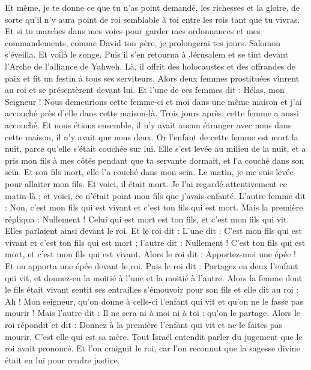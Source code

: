 \begin{multicols}{2}
Et même, je te donne ce que tu n'as point demandé, les richesses et la gloire, de sorte qu'il n'y aura point de roi semblable à toi entre les rois tant que tu vivras.
Et si tu marches dans mes voies pour garder mes ordonnances et mes commandements, comme David ton père, je prolongerai tes jours.
Salomon s'éveilla. Et voilà le songe. Puis il s'en retourna à Jérusalem et se tint devant l'Arche de l'alliance de Yahweh. Là, il offrit des holocaustes et des offrandes de paix et fit un festin à tous ses serviteurs.
Alors deux femmes prostituées vinrent au roi et se présentèrent devant lui.
Et l'une de ces femmes dit : Hélas, mon Seigneur ! Nous demeurions cette femme-ci et moi dans une même maison et j'ai accouché près d'elle dans cette maison-là.
Trois jours après, cette femme a aussi accouché. Et nous étions ensemble, il n'y avait aucun étranger avec nous dans cette maison, il n'y avait que nous deux.
Or l'enfant de cette femme est mort la nuit, parce qu'elle s'était couchée sur lui.
Elle s'est levée au milieu de la nuit, et a pris mon fils à mes côtés pendant que ta servante dormait, et l'a couché dans son sein. Et son fils mort, elle l'a couché dans mon sein.
Le matin, je me suis levée pour allaiter mon fils. Et voici, il était mort. Je l'ai regardé attentivement ce matin-là ; et voici, ce n'était point mon fils que j'avais enfanté.
L'autre femme dit : Non, c'est mon fils qui est vivant et c'est ton fils qui est mort. Mais la première répliqua : Nullement ! Celui qui est mort est ton fils, et c'est mon fils qui vit. Elles parlaient ainsi devant le roi.
Et le roi dit : L'une dit : C'est mon fils qui est vivant et c'est ton fils qui est mort ; l'autre dit : Nullement ! C'est ton fils qui est mort, et c'est mon fils qui est vivant.
Alors le roi dit : Apportez-moi une épée ! Et on apporta une épée devant le roi.
Puis le roi dit : Partagez en deux l'enfant qui vit, et donnez-en la moitié à l'une et la moitié à l'autre.
Alors la femme dont le fils était vivant sentit ses entrailles s'émouvoir pour son fils et elle dit au roi : Ah ! Mon seigneur, qu'on donne à celle-ci l'enfant qui vit et qu'on ne le fasse pas mourir ! Mais l'autre dit : Il ne sera ni à moi ni à toi ; qu'on le partage.
Alors le roi répondit et dit : Donnez à la première l'enfant qui vit et ne le faites pas mourir. C'est elle qui est sa mère.
Tout Israël entendit parler du jugement que le roi avait prononcé. Et l'on craignit le roi, car l'on reconnut que la sagesse divine était en lui pour rendre justice.

\end{multicols}
